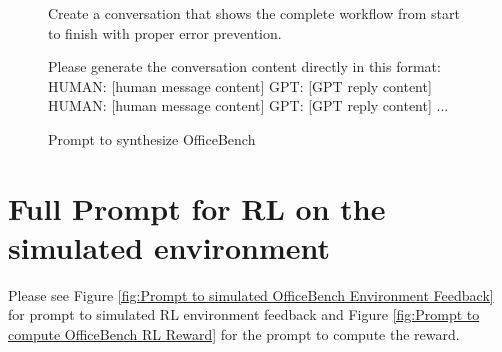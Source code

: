 \begin{figure}[htbp]
\begin{tcolorbox}[title=Prompt to synthesize OfficeBench]
\begin{tcblisting}
Create a conversation that shows the complete workflow from start to finish with proper error prevention.

Please generate the conversation content directly in this format:
HUMAN: [human message content]
GPT: [GPT reply content]
HUMAN: [human message content] 
GPT: [GPT reply content]
... 

\end{tcblisting}
\end{tcolorbox}
\caption{Prompt to synthesize OfficeBench}
\label{fig:Prompt to synthesize OfficeBench}
\end{figure}


\section{Full Prompt for RL on the simulated environment}
\label{appendix:prompt_rl}
Please see Figure \ref{fig:Prompt to simulated OfficeBench Environment Feedback} for prompt to simulated RL environment feedback and Figure \ref{fig:Prompt to compute OfficeBench RL Reward} for the prompt to compute the reward.

